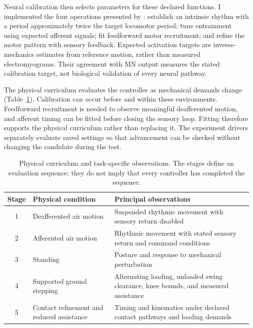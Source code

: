Neural calibration then selects parameters for these declared functions. I implemented the four operations presented by \citet{hunt_inrc_2019}: establish an intrinsic rhythm with a period approximately twice the target locomotor period; tune entrainment using expected afferent signals; fit feedforward motor recruitment; and refine the motor pattern with sensory feedback. Expected activation targets are inverse-mechanics estimates from reference motion, rather than measured electromyograms. Their agreement with MN output measures the stated calibration target, not biological validation of every neural pathway.

The physical curriculum evaluates the controller as mechanical demands change (Table~\ref{tab:sns_curriculum}). Calibration can occur before and within these environments. Feedforward recruitment is needed to observe meaningful deafferented motion, and afferent timing can be fitted before closing the sensory loop. Fitting therefore supports the physical curriculum rather than replacing it. The experiment drivers separately evaluate saved settings so that advancement can be checked without changing the candidate during the test.

\begin{table}[htbp]
\centering\small
\caption[Physical curriculum for coupled-model evaluation]{Physical curriculum and task-specific observations. The stages define an evaluation sequence; they do not imply that every controller has completed the sequence.}
\label{tab:sns_curriculum}
\begin{tabularx}{\textwidth}{@{}c>{\raggedright\arraybackslash}p{}>{\raggedright\arraybackslash}X@{}}
\toprule
Stage & Physical condition & Principal observations \\
\midrule
1 & Deafferented air motion & Suspended rhythmic movement with sensory return disabled \\
2 & Afferented air motion & Rhythmic movement with stated sensory return and command conditions \\
3 & Standing & Posture and response to mechanical perturbation \\
4 & Supported ground stepping & Alternating loading, unloaded swing clearance, knee bounds, and measured assistance \\
5 & Contact refinement and reduced assistance & Timing and kinematics under declared contact pathways and loading demands \\
\bottomrule
\end{tabularx}
\end{table}

